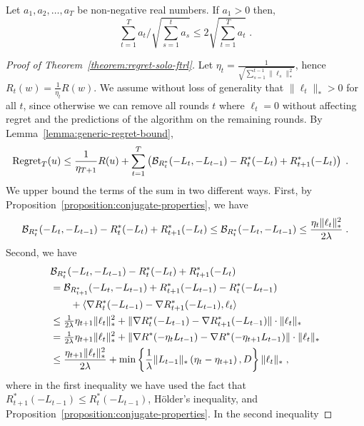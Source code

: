 \begin{lemma}
\label{lemma:sum-of-square-roots-inverses}
Let $a_1, a_2, \dots, a_T$ be non-negative real numbers. If $a_1 > 0$ then,
$$
\sum_{t=1}^T a_t / \sqrt{\sum_{s=1}^t a_s} \le 2 \sqrt{\sum_{t=1}^T a_t} \; .
$$
\end{lemma}

\begin{proof}[Proof of Theorem~\ref{theorem:regret-solo-ftrl}]
Let $\eta_t=\tfrac{1}{\sqrt{\sum_{s=1}^{t-1} \|\ell_s\|_*^2}}$, hence $R_t(w) = \tfrac{1}{\eta_t} R(w)$.
We assume without loss of
generality that $\|\ell_t\|_* > 0$ for all $t$, since otherwise we can remove
all rounds $t$ where $\ell_t = 0$ without affecting regret and the
predictions of the algorithm on the remaining rounds.
By Lemma~\ref{lemma:generic-regret-bound},
\begin{align*}
\operatorname{Regret}_T(u)
& \le \frac{1}{\eta_{T+1}} R(u) + \sum_{t=1}^T \left( \mathcal{B}_{R_t^*}(-L_t, -L_{t-1}) - R_t^*(-L_t) + R_{t+1}^*(-L_t) \right) \; .
\end{align*}
We upper bound the terms of the sum in two different ways.
First, by Proposition~\ref{proposition:conjugate-properties}, we have
$$
\mathcal{B}_{R_t^*}(-L_t, -L_{t-1}) - R_t^*(-L_t) + R_{t+1}^*(-L_t)
\le \mathcal{B}_{R_t^*}(-L_t, -L_{t-1})
\le \frac{\eta_t \|\ell_t\|_*^2}{2\lambda} \; .
$$
Second, we have
\begin{align*}
& \mathcal{B}_{R_t^*}(-L_t, -L_{t-1}) - R_t^*(-L_t) + R_{t+1}^*(-L_t) \\
& = \mathcal{B}_{R_{t+1}^*}(-L_t, -L_{t-1}) + R^*_{t+1}(-L_{t-1}) - R_t^*(-L_{t-1}) \\
& \qquad + \langle \nabla R_t^*(-L_{t-1})-\nabla R_{t+1}^*(-L_{t-1}), \ell_t \rangle  \\
& \le \tfrac{1}{2\lambda} \eta_{t+1} \|\ell_t\|_*^2 + \| \nabla R_t^*(-L_{t-1})-\nabla R_{t+1}^*(-L_{t-1})\| \cdot \|\ell_t\|_* \\
& = \tfrac{1}{2\lambda} \eta_{t+1} \|\ell_t\|_*^2 + \| \nabla R^*(- \eta_{t} L_{t-1})-\nabla R^*(- \eta_{t+1} L_{t-1})\| \cdot \|\ell_t\|_* \\
& \le \frac{\eta_{t+1} \|\ell_t\|_*^2}{2\lambda} + \min\left\{\frac{1}{\lambda} \|L_{t-1}\|_* \left(\eta_{t} - \eta_{t+1} \right), D\right\} \|\ell_t\|_* \; ,
\end{align*}
where in the first inequality we have used the fact that $R^*_{t+1}(-L_{t-1})
\le R_t^*(-L_{t-1})$, H\"older's inequality, and
Proposition~\ref{proposition:conjugate-properties}.  In the second inequality

\end{proof}
